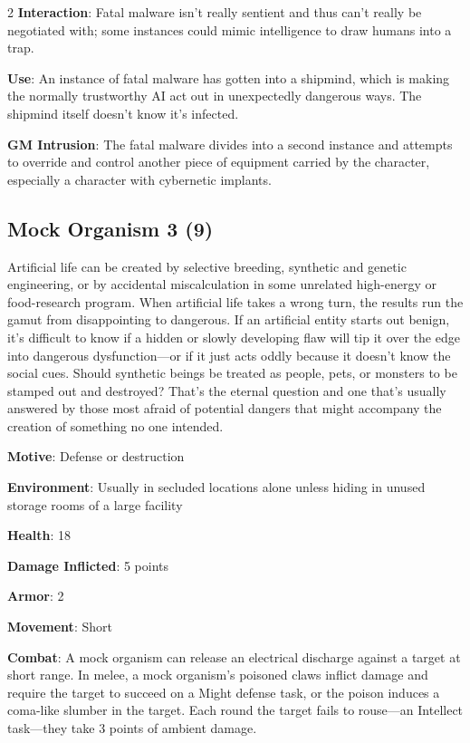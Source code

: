 \begin{multicols}{2}
\textbf{Interaction}: Fatal malware isn’t really sentient and thus can’t really be negotiated with; some instances could mimic intelligence to draw humans into a trap. 

\textbf{Use}: An instance of fatal malware has gotten into a shipmind, which is making the normally trustworthy AI act out in unexpectedly dangerous ways. The shipmind itself doesn’t know it’s infected.

\textbf{GM Intrusion}: The fatal malware divides into a second instance and attempts to override and control another piece of equipment carried by the character, especially a character with cybernetic implants.

\subsection{Mock Organism 3 (9)}

Artificial life can be created by selective breeding, synthetic and genetic engineering, or by accidental miscalculation in some unrelated high-energy or food-research program. When artificial life takes a wrong turn, the results run the gamut from disappointing to dangerous. If an artificial entity starts out benign, it’s difficult to know if a hidden or slowly developing flaw will tip it over the edge into dangerous dysfunction—or if it just acts oddly because it doesn’t know the social cues. Should synthetic beings be treated as people, pets, or monsters to be stamped out and destroyed? That’s the eternal question and one that’s usually answered by those most afraid of potential dangers that might accompany the creation of something no one intended. 

\textbf{Motive}: Defense or destruction 

\textbf{Environment}: Usually in secluded locations alone unless hiding in unused storage rooms of a large facility 

\textbf{Health}: 18 

\textbf{Damage Inflicted}:  5 points 

\textbf{Armor}: 2 

\textbf{Movement}: Short 

\textbf{Combat}: A mock organism can release an electrical discharge against a target at short range. In melee, a mock organism’s poisoned claws inflict damage and require the target to succeed on a Might defense task, or the poison induces a coma-like slumber in the target. Each round the target fails to rouse—an Intellect task—they take 3 points of ambient damage. 


\end{multicols}
